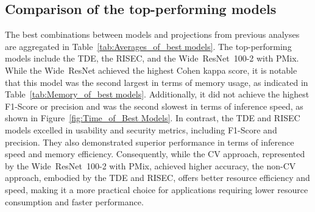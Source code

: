 





\FloatBarrier

\subsection{Comparison of the top-performing models}


The best combinations between models and projections from previous analyses are aggregated in Table~\ref{tab:Averages_of_best models}. The top-performing models include the \gls{TDE}, the \gls{RISEC}, and the \mbox{Wide ResNet 100-2} with \gls{PMix}. While the \mbox{Wide ResNet} achieved the highest Cohen kappa score, it is notable that this model was the second largest in terms of memory usage, as indicated in Table~\ref{tab:Memory_of_best models}. Additionally, it did not achieve the highest F1-Score or precision and was the second slowest in terms of inference speed, as shown in Figure~\ref{fig:Time_of_Best Models}. In contrast, the \gls{TDE} and \gls{RISEC} models excelled in usability and security metrics, including F1-Score and precision. They also demonstrated superior performance in terms of inference speed and memory efficiency. Consequently, while the \gls{CV} approach, represented by the \mbox{Wide ResNet 100-2} with \gls{PMix}, achieved higher accuracy, the non-\gls{CV} approach, embodied by the \gls{TDE} and \gls{RISEC}, offers better resource efficiency and speed, making it a more practical choice for applications requiring lower resource consumption and faster performance.


